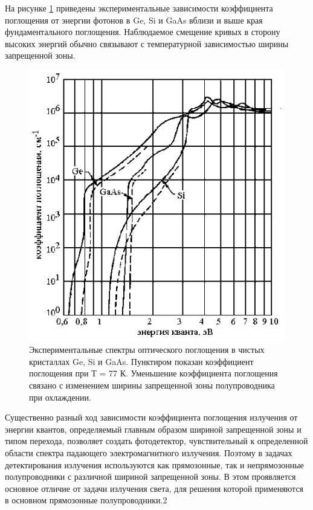\documentclass[a4paper,12pt]{article}
\begin{document}
На рисунке \ref{fig:figure3} приведены экспериментальные зависимости коэффициента поглощения от энергии фотонов в Ge, Si и GaAs вблизи и выше края фундаментального поглощения. Наблюдаемое смещение кривых в сторону высоких энергий обычно связывают с температурной зависимостью ширины запрещенной зоны.


\begin{figure}[H]
	\centering
	\includegraphics[]{4}
	\caption{Экспериментальные спектры оптического поглощения в чистых кристаллах Ge, Si и GaAs. Пунктиром показан коэффициент поглощения при Т = 77 К. Уменьшение коэффициента поглощения связано с изменением ширины запрещенной зоны полупроводника при охлаждении.}
	\label{fig:figure3}
\end{figure}


Существенно разный ход зависимости коэффициента поглощения излучения от энергии квантов, определяемый главным образом шириной запрещенной зоны и типом перехода, позволяет создать фотодетектор, чувствительный к определенной области спектра падающего электромагнитного излучения. Поэтому в задачах детектирования излучения используются как прямозонные, так и непрямозонные полупроводники с различной шириной запрещенной зоны. В этом проявляется основное отличие от задачи излучения света, для решения которой применяются в основном прямозонные полупроводники.2
\end{document}
